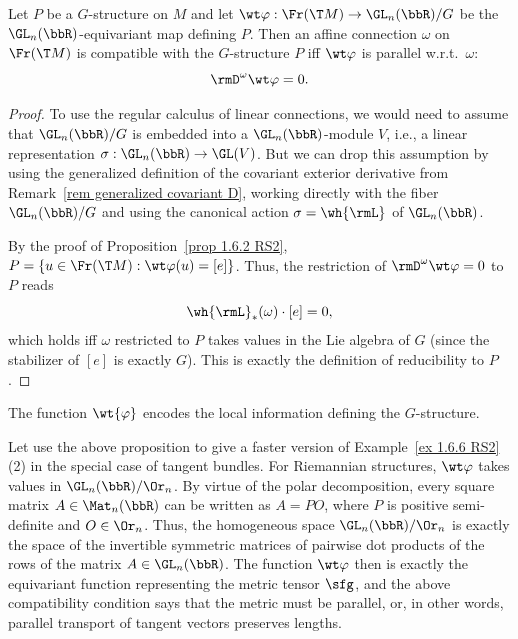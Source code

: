 \begin{prop}[{{\cite[Prop.~2.2.3]{RS2}}}]\label{prop 2.2.3 RS2}
    Let $P$ be a $G$-structure on $M$ and let $\wt\varphi:\Fr(\T M)\to \GL_n(\bbR)\slash G$ be the $\GL_n(\bbR)$-equivariant map defining $P$.  Then an affine connection $\omega$ on $\Fr(\T M)$ is compatible with the $G$-structure $P$ iff $\wt\varphi$ is parallel w.r.t.\ $\omega$:
    \[\rmD^\omega\wt\varphi=0.\]
\end{prop}
\begin{proof}
    To use the regular calculus of linear connections, we would need to assume that $\GL_n(\bbR)\slash G$ is embedded into a $\GL_n(\bbR)$-module $V$, i.e., a linear representation $\sigma:\GL_n(\bbR)\to \GL(V)$. But we can drop this assumption by using the generalized definition of the covariant exterior derivative from Remark~\ref{rem generalized covariant D}, working directly with the fiber $\GL_n(\bbR)\slash G$ and using the canonical action $\sigma=\wh{\rmL}$ of $\GL_n(\bbR)$.

    By the proof of Proposition~\ref{prop 1.6.2 RS2}, $P=\{u\in \Fr(\T M):\wt\varphi(u)=[e]\}$. Thus, the restriction of $\rmD^\omega\wt\varphi=0$ to $P$ reads 
    \[\wh{\rmL}_\ast(\omega)\cdot[e]=0,\]
    which holds iff $\omega$ restricted to $P$ takes values in the Lie algebra of $G$ (since the stabilizer of $[e]$ is exactly $G$). This is exactly the definition of reducibility to $P$.
\end{proof}

The function $\wt{\varphi}$ encodes the local information defining the $G$-structure. 

\begin{example}
    Let use the above proposition to give a faster version of Example~\ref{ex 1.6.6 RS2}(2) in the special case of tangent bundles. For Riemannian structures, $\wt\varphi$ takes values in $\GL_n(\bbR)\slash\Or_n$. By virtue of the polar decomposition, every square matrix $A\in \Mat_n(\bbR)$ can be written as $A=PO$, where $P$ is positive semi-definite and $O\in \Or_n$. Thus, the homogeneous space $\GL_n(\bbR)\slash\Or_n$ is exactly the space of the invertible symmetric matrices of pairwise dot products of the rows of the matrix $A\in \GL_n(\bbR)$. The function $\wt\varphi$ then is exactly the equivariant function representing the metric tensor $\sfg$, and the above compatibility condition says that the metric must be parallel, or, in other words, parallel transport of tangent vectors preserves lengths. 
\end{example} 


